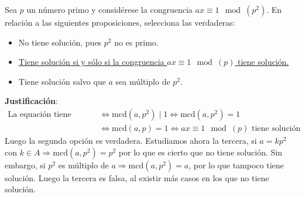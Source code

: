 \newpage
\begin{ejercicio}
    Sea $p$ un número primo y considérese la congruencia $ax\equiv 1\mod (p^2)$. En relación a las siguientes proposiciones, selecciona las verdaderas:
    \begin{itemize}
        \item No tiene solución, pues $p^2$ no es primo.
        \item \underline{Tiene solución si y sólo si la congruencia $ax\equiv 1\mod (p)$ tiene solución.}
        \item Tiene solución salvo que $a$ sea múltiplo de $p^2$.
    \end{itemize}

    \noindent
    \textbf{Justificación}:
    \begin{align*}
        \text{La\ equación\ tiene\ solución\ } &\Longleftrightarrow \text{mcd}(a,p^2) \mid 1 \Longleftrightarrow \text{mcd}(a,p^2) = 1 \\
                                              &\Longleftrightarrow \text{mcd}(a,p)= 1 \Longleftrightarrow ax\equiv 1\mod (p) \text{\ tiene\ solución}
    \end{align*}
    Luego la segunda opción es verdadera. Estudiamos ahora la tercera, si $a = kp^2$ con $k \in A \Longrightarrow \text{mcd}(a,p^2) = p^2$ por lo que es cierto que no tiene solución. Sin embargo, si $p^2$ es múltiplo de $a \Longrightarrow \text{mcd}(a,p^2) = a$, por lo que tampoco tiene solución.
    Luego la tercera es falsa, al existir más casos en los que no tiene solución.
\end{ejercicio}

\newpage
\resetearcontador
